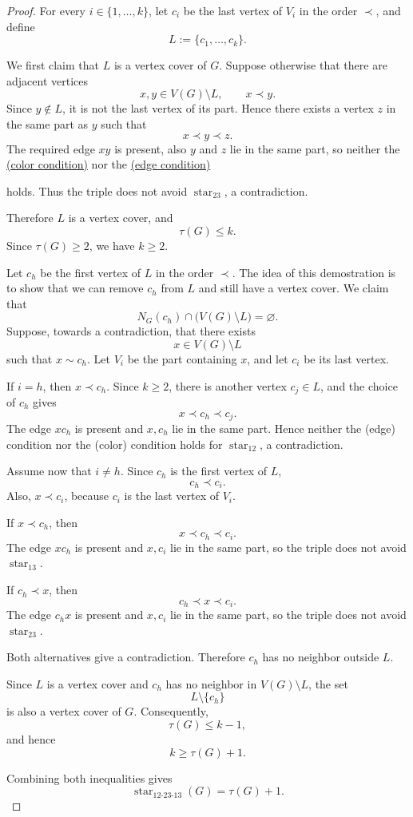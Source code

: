 \documentclass[12pt]{article}
\theoremstyle{plain}
\theoremstyle{definition}
\theoremstyle{remark}
\theoremstyle{definition}
\newcommand{\edgecondition}{%
  \hyperref[def:avoid:cond:edge]{(edge condition)}\xspace
}
\newcommand{\colorcondition}{%
  \hyperref[def:avoid:cond:color]{(color condition)}\xspace
}
\begin{document}
\begin{proof}
For every \(i\in\{1,\dots,k\}\), let \(c_i\) be the last vertex of \(V_i\) in the order \(\prec\), and define
\[
L:=\{c_1,\dots,c_k\}.
\]

We first claim that \(L\) is a vertex cover of \(G\). Suppose otherwise that there are adjacent vertices
\[
x,y\in V(G)\setminus L,
\qquad
x\prec y.
\]
Since \(y\notin L\), it is not the last vertex of its part. Hence there exists a vertex \(z\) in the same part as
\(y\) such that
\[
x\prec y\prec z.
\]
The required edge \(xy\) is present, also \(y\) and \(z\) lie in the same part, so  neither the \colorcondition nor the \edgecondition
holds. Thus the triple does not avoid \(\operatorname{star}_{23}\), a contradiction.

Therefore \(L\) is a vertex cover, and
\[
\tau(G)\le k.
\]
Since \(\tau(G)\ge 2\), we have \(k\ge 2\).

Let \(c_h\) be the first vertex of \(L\) in the order \(\prec\). The idea of this demostration is
to show that we can remove \(c_h\) from \(L\) and still have a vertex cover. We claim that
\[
N_G(c_h)\cap \bigl(V(G)\setminus L\bigr)=\varnothing.
\]
Suppose, towards a contradiction, that there exists
\[
x\in V(G)\setminus L
\]
such that \(x\sim c_h\). Let \(V_i\) be the part containing \(x\), and let \(c_i\) be its last vertex.

If \(i=h\), then \(x\prec c_h\). Since \(k\ge 2\), there is another vertex \(c_j\in L\), and the choice of \(c_h\)
gives
\[
x\prec c_h\prec c_j.
\]
The edge \(xc_h\) is present and \(x,c_h\) lie in the same part. Hence neither the \textup{(edge)} condition nor
the \textup{(color)} condition holds for \(\operatorname{star}_{12}\), a contradiction.

Assume now that \(i\neq h\). Since \(c_h\) is the first vertex of \(L\),
\[
c_h\prec c_i.
\]
Also, \(x\prec c_i\), because \(c_i\) is the last vertex of \(V_i\).

If \(x\prec c_h\), then
\[
x\prec c_h\prec c_i.
\]
The edge \(xc_h\) is present and \(x,c_i\) lie in the same part, so the triple does not avoid
\(\operatorname{star}_{13}\).

If \(c_h\prec x\), then
\[
c_h\prec x\prec c_i.
\]
The edge \(c_hx\) is present and \(x,c_i\) lie in the same part, so the triple does not avoid
\(\operatorname{star}_{23}\).

Both alternatives give a contradiction. Therefore \(c_h\) has no neighbor outside \(L\).

Since \(L\) is a vertex cover and \(c_h\) has no neighbor in \(V(G)\setminus L\), the set
\[
L\setminus\{c_h\}
\]
is also a vertex cover of \(G\). Consequently,
\[
\tau(G)\le k-1,
\]
and hence
\[
k\ge \tau(G)+1.
\]

Combining both inequalities gives
\[
\operatorname{star}_{12\text{-}23\text{-}13}(G)=\tau(G)+1.
\]
\end{proof}
\end{document}

